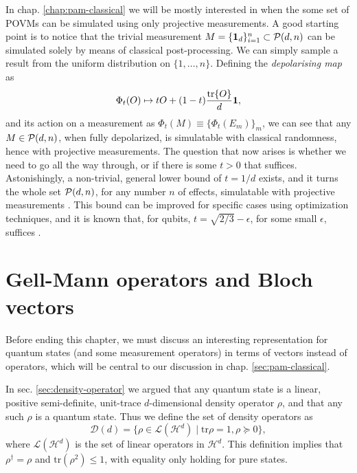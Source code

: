 		In chap. \ref{chap:pam-classical} we will be mostly interested in when the some set of POVMs can be simulated using only projective measurements. A good starting point is to notice that the trivial measurement $M = \{ \mathbf{1}_d \}_{i=1}^n \subset \mathcal{P}(d,n)$ can be simulated solely by means of classical post-processing. We can simply sample a result from the uniform distribution on $\{ 1, \ldots, n \}$. Defining the \emph{depolarising map} as 
		$$
			\Phi_t(O) \mapsto t O + (1-t) \frac{ \tr{O} }{d} \mathbf{1} ,
		$$
		and its action on a measurement as $\Phi_t (M) \equiv \{ \Phi_t(E_m) \}_m$, we can see that any $M \in \mathcal{P}(d,n)$, when fully depolarized, is simulatable with classical randomness, hence with projective measurements. The question that now arises is whether we need to go all the way through, or if there is some $t > 0$ that suffices. Astonishingly, a non-trivial, general lower bound of $t = 1/d$ exists, and it turns the whole set $\mathcal{P}(d,n)$, for any number $n$ of effects, simulatable with projective measurements \cite{oszmaniec_2017_simulating}. This bound can be improved for specific cases using optimization techniques, and it is known that, for qubits, $t = \sqrt{2/3} - \epsilon$, for some small $\epsilon$, suffices \cite{guerini_tese}.
		

	\section{Gell-Mann operators and Bloch vectors}

		Before ending this chapter, we must discuss an interesting representation for quantum states (and some measurement operators) in terms of vectors instead of operators, which will be central to our discussion in chap. \ref{sec:pam-classical}.

		In sec. \ref{sec:density-operator} we argued that any quantum state is a linear, positive semi-definite, unit-trace $d$-dimensional density operator $\rho$, and that any such $\rho$ is a quantum state. Thus we define the set of density operators as
		$$
			\mathcal{D}(d) = \{ \rho \in \mathcal{L}(\mathcal{H}^d) \mid \text{tr}\rho=1, \rho \succeq0 \} ,
		$$
		where $\mathcal{L}(\mathcal{H}^d)$ is the set of linear operators in $\mathcal{H}^d$. This definition implies that $\rho^\dagger = \rho$ and $\text{tr}(\rho^2) \leq 1$, with equality only holding for pure states.

